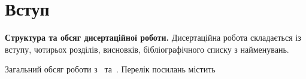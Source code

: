 \chapter*{Вступ}

\newcommand{\actuality}{\textbf{Актуальність теми дослідження.}}
\newcommand{\relationship}{\textbf{Зв’язок роботи з науковими програмами, планами, темами.}}
\newcommand{\aim}{\textbf{Мета і задачі дослідження.}}
\newcommand{\objectofstudy}{\textit{Об’єктом дослідження}}
\newcommand{\subjectofstudy}{\textit{Предметом дослідження}}
\newcommand{\methodofstudy}{\textit{Методи дослідження.}}
\newcommand{\defpositions}{\textbf{Основні положення для захисту}}
\newcommand{\novelty}{\textbf{Наукова новизна одержаних результатів.}}
\newcommand{\influence}{\textbf{Практичне значення одержаних результатів.}}
\newcommand{\probation}{\textbf{Апробація результатів дисертації.}}
\newcommand{\contribution}{\textbf{Особистий внесок здобувача.}}
\newcommand{\publications}{\textbf{Публікації.}}




\textbf{Структура та обсяг дисертаційної роботи.} Дисертаційна робота складається із вступу, чотирьох розділів,
висновків, бібліографічного списку з  найменувань.

Загальний обсяг роботи
з~
та~. Перелік посилань містить

\vspace{0pt plus1fill}

\newcommand{\tanks}{}
